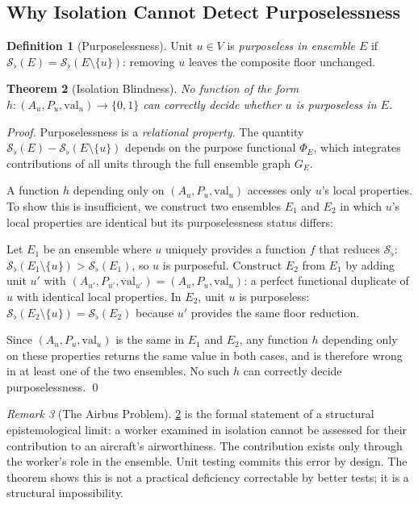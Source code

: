 \documentclass[twocolumn,a4paper,11pt]{article}
\theoremstyle{plain}
\newtheorem{theorem}{Theorem}[section]
\theoremstyle{definition}
\newtheorem{definition}[theorem]{Definition}
\theoremstyle{remark}
\newtheorem{remark}[theorem]{Remark}
\newcommand{\Sflat}{\mathcal{S}_{\flat}}
\begin{document}
\subsection{Why Isolation Cannot Detect Purposelessness}

\begin{definition}[Purposelessness]
\label{def:purposeless}
Unit $u \in V$ is \emph{purposeless in ensemble $E$} if
$\Sflat(E) = \Sflat(E \setminus \{u\})$: removing $u$ leaves the
composite floor unchanged.
\end{definition}

\begin{theorem}[Isolation Blindness]
\label{thm:isolation-blind}
No function of the form $h: (A_u, P_u, \mathrm{val}_u) \to \{0,1\}$
can correctly decide whether $u$ is purposeless in $E$.
\end{theorem}

\begin{proof}
Purposelessness is a \emph{relational property}. The quantity
$\Sflat(E) - \Sflat(E \setminus \{u\})$ depends on the purpose
functional $\Phi_E$, which integrates contributions of all units through
the full ensemble graph $G_E$.

A function $h$ depending only on $(A_u, P_u, \mathrm{val}_u)$ accesses
only $u$'s local properties. To show this is insufficient, we construct
two ensembles $E_1$ and $E_2$ in which $u$'s local properties are
identical but its purposelessness status differs:

Let $E_1$ be an ensemble where $u$ uniquely provides a function $f$ that
reduces $\Sflat$: $\Sflat(E_1 \setminus \{u\}) > \Sflat(E_1)$, so $u$
is purposeful. Construct $E_2$ from $E_1$ by adding unit $u'$ with
$(A_{u'}, P_{u'}, \mathrm{val}_{u'}) = (A_u, P_u, \mathrm{val}_u)$:
a perfect functional duplicate of $u$ with identical local properties.
In $E_2$, unit $u$ is purposeless:
$\Sflat(E_2 \setminus \{u\}) = \Sflat(E_2)$ because $u'$ provides the
same floor reduction.

Since $(A_u, P_u, \mathrm{val}_u)$ is the same in $E_1$ and $E_2$, any
function $h$ depending only on these properties returns the same value in
both cases, and is therefore wrong in at least one of the two ensembles.
No such $h$ can correctly decide purposelessness. \qed
\end{proof}

\begin{remark}[The Airbus Problem]
\cref{thm:isolation-blind} is the formal statement of a structural
epistemological limit: a worker examined in isolation cannot be assessed
for their contribution to an aircraft's airworthiness. The contribution
exists only through the worker's role in the ensemble. Unit testing commits
this error by design. The theorem shows this is not a practical deficiency
correctable by better tests; it is a structural impossibility.
\end{remark}
\end{document}
